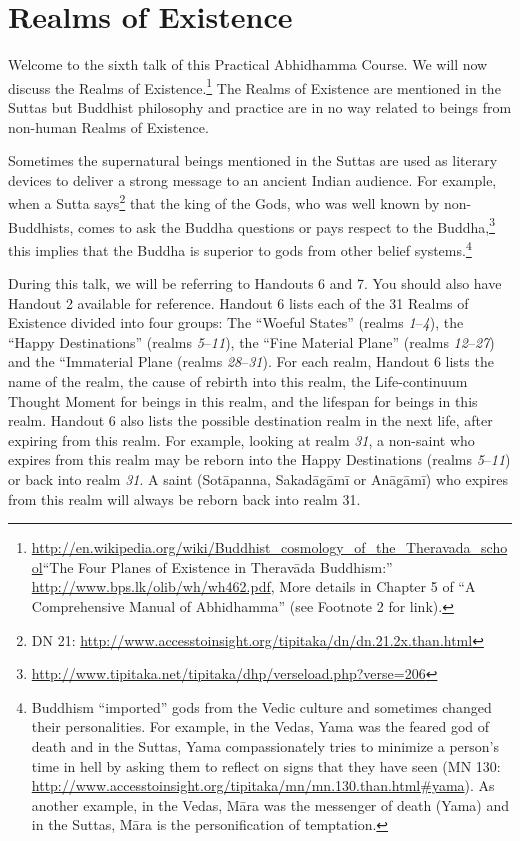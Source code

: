 \section{Realms of Existence}

Welcome to the sixth talk of this Practical Abhidhamma Course. We will now discuss the Realms of Existence.\footnote{\url{http://en.wikipedia.org/wiki/Buddhist_cosmology_of_the_Theravada_school}\linebreak “The Four Planes of Existence in Theravāda Buddhism:” \url{http://www.bps.lk/olib/wh/wh462.pdf}, More details in Chapter 5 of “A Comprehensive Manual of Abhidhamma” (see Footnote 2 for link).} The Realms of Existence are mentioned in the Suttas but Buddhist philosophy and practice are in no way related to beings from non-human Realms of Existence. 

Sometimes the supernatural beings mentioned in the Suttas are used as literary devices to deliver a strong message to an ancient Indian audience. For example, when a Sutta says\footnote{DN 21: \url{http://www.accesstoinsight.org/tipitaka/dn/dn.21.2x.than.html}} that the king of the Gods, who was well known by non-Buddhists, comes to ask the Buddha questions or pays respect to the Buddha,\footnote{\url{http://www.tipitaka.net/tipitaka/dhp/verseload.php?verse=206}} this implies that the Buddha is superior to gods from other belief systems.\footnote{Buddhism “imported” gods from the Vedic culture and sometimes changed their personalities. For example, in the Vedas, Yama was the feared god of death and in the Suttas, Yama compassionately tries to minimize a person’s time in hell by asking them to reflect on signs that they have seen (MN 130: \url{http://www.accesstoinsight.org/tipitaka/mn/mn.130.than.html\#yama}). As another example, in the Vedas, Māra was the messenger of death (Yama) and in the Suttas, Māra is the personification of temptation.}

During this talk, we will be referring to Handouts 6 and 7. You should also have Handout 2 available for reference. Handout 6 lists each of the 31 Realms of Existence divided into four groups: The “Woeful States” (realms \textit{1}--\textit{4}), the “Happy Destinations” (realms \textit{5}--\textit{11}), the “Fine Material Plane” (realms \textit{12}--\textit{27}) and the “Immaterial Plane (realms \textit{28}--\textit{31}). For each realm, Handout 6 lists the name of the realm, the cause of rebirth into this realm, the Life-continuum Thought Moment for beings in this realm, and the lifespan for beings in this realm. Handout 6 also lists the possible destination realm in the next life, after expiring from this realm. For example, looking at realm \textit{31}, a non-saint who expires from this realm may be reborn into the Happy Destinations (realms \textit{5}--\textit{11}) or back into realm \textit{31}. A saint (Sotāpanna, Sakadāgāmī or Anāgāmī) who expires from this realm will always be reborn back into realm 31.

